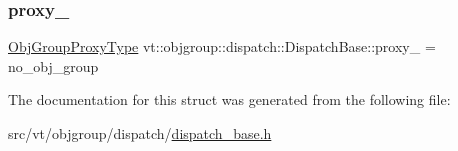 \subsubsection{\texorpdfstring{proxy\+\_\+}{proxy\_}}
{\footnotesize\ttfamily \hyperlink{namespacevt_ad7cae989df485fccca57f0792a880a8e}{Obj\+Group\+Proxy\+Type} vt\+::objgroup\+::dispatch\+::\+Dispatch\+Base\+::proxy\+\_\+ = no\+\_\+obj\+\_\+group\hspace{0.3cm}{\ttfamily [private]}}



The documentation for this struct was generated from the following file\+:\begin{DoxyCompactItemize}
\item 
src/vt/objgroup/dispatch/\hyperlink{dispatch__base_8h}{dispatch\+\_\+base.\+h}\end{DoxyCompactItemize}
